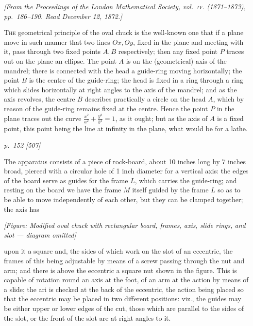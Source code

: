 \documentclass[11pt,a4paper]{book}
\begin{document}
\begin{center}
\textit{[From the Proceedings of the London Mathematical Society, vol.~\textsc{iv}. (1871--1873), pp.~186--190.  Read December 12, 1872.]}
\end{center}

\textsc{The} geometrical principle of the oval chuck is the well-known one that if a
plane move in such manner that two lines $Ox, Oy$, fixed in the plane and meeting
with it, pass through two fixed points $A, B$ respectively; then any fixed point $P$ traces
out on the plane an ellipse. The point $A$ is on the (geometrical) axis of the mandrel;
there is connected with the head a guide-ring moving horizontally; the point $B$ is
the centre of the guide-ring; the head is fixed in a ring through a ring which slides
horizontally at right angles to the axis of the mandrel; and as the axis revolves,
the centre $B$ describes practically a circle on the head $A$, which by reason of the
guide-ring remains fixed at the centre. Hence the point $P$ in the plane traces
out the curve $\frac{x^2}{a^2} + \frac{y^2}{b^2} = 1$, as it ought; but as the axis of $A$ is a fixed point,
this point being the line at infinity in the plane, what would be for a lathe.

\clearpage

\bigskip
\textit{p.~152 [507]}
\smallskip

\noindent
The apparatus consists of a piece of rock-board, about 10 inches long by 7 inches
broad, pierced with a circular hole of 1 inch diameter for a vertical axis: the edges
of the board serve as guides for the frame $L$, which carries the guide-ring; and resting
on the board we have the frame $M$ itself guided by the frame $L$ so as to be able to
move independently of each other, but they can be clamped together; the axis has

\begin{center}
\textit{[Figure: Modified oval chuck with rectangular board, frames, axis, slide rings, and slot --- diagram omitted]}
\end{center}

\noindent
upon it a square and, the sides of which work on the slot of an eccentric, the frames
of this being adjustable by means of a screw passing through the nut and arm; and
there is above the eccentric a square nut shown in the figure. This is capable of
rotation round an axis at the foot, of an arm at the action by means of a slide; the
ari is checked at the back of the eccentric, the action being placed so that the eccentric
may be placed in two different positions: viz., the guides may be either upper or lower
edges of the cut, those which are parallel to the sides of the slot, or the front of the slot
are at right angles to it.
\end{document}
